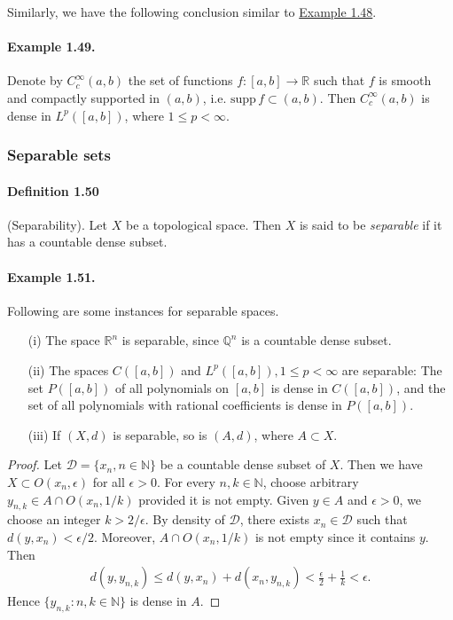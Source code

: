 \documentclass{article}
\newcommand{\supp}{\mathrm{supp}\,}
\renewcommand{\proofname}{\textit{Proof}}
\begin{document}
Similarly, we have the following conclusion similar to \hyperref[example:1.48]{Example 1.48}.

\paragraph{Example 1.49.\label{example:1.49}} Denote by $C_c^\infty(a,b)$ the set of functions $f:[a,b]\to\mathbb{R}$ such that $f$ is smooth and compactly supported in $(a,b)$, i.e. $\supp f\subset (a,b)$. Then $C_c^\infty(a,b)$ is dense in $L^p([a,b])$, where $1\leq p < \infty$.

\newpage
\subsubsection{Separable sets}
\paragraph{Definition 1.50\label{def:1.50}} (Separability). Let $X$ be a topological space. Then $X$ is said to be \textit{separable} if it has a countable dense subset.

\paragraph{Example 1.51.\label{example:1.51}} Following are some instances for separable spaces.
\vspace{0.1cm}
\begin{itemize}
	\item[(i)] The space $\mathbb{R}^n$ is separable, since $\mathbb{Q}^n$ is a countable dense subset.
	\vspace{0.1cm}
	\item[(ii)] The spaces $C([a,b])$ and $L^p([a,b]), 1\leq p <\infty$ are separable: The set $P([a,b])$ of all polynomials on $[a,b]$ is dense in $C([a,b])$, and the set of all polynomials with rational coefficients is dense in $P([a,b])$.
	\vspace{0.1cm}
	\item[(iii)] If $(X,d)$ is separable, so is $(A,d)$, where $A\subset X$.
\end{itemize}
\renewcommand{\proofname}{Proof of (iii).}
\begin{proof}
Let $\mathcal{D}=\{x_n,n\in\mathbb{N}\}$ be a countable dense subset of $X$. Then we have $X\subset O(x_n,\epsilon)$ for all $\epsilon>0$. For every $n,k\in\mathbb{N}$, choose arbitrary $y_{n,k}\in A\cap O(x_n,1/k)$ provided it is not empty. Given $y\in A$ and $\epsilon > 0$, we choose an integer $k > 2/\epsilon$. By density of $\mathcal{D}$, there exists $x_n\in\mathcal{D}$ such that $d(y,x_n)<\epsilon / 2$. Moreover, $A\cap O(x_n,1/k)$ is not empty since it contains $y$. Then
\begin{align*}
	d(y,y_{n,k}) \leq d(y,x_n) + d(x_n,y_{n,k}) < \frac{\epsilon}{2} + \frac{1}{k} < \epsilon.
\end{align*}
Hence $\{y_{n,k}:n,k\in\mathbb{N}\}$ is dense in $A$.
\end{proof}
\renewcommand{\proofname}{Proof}
\end{document}
